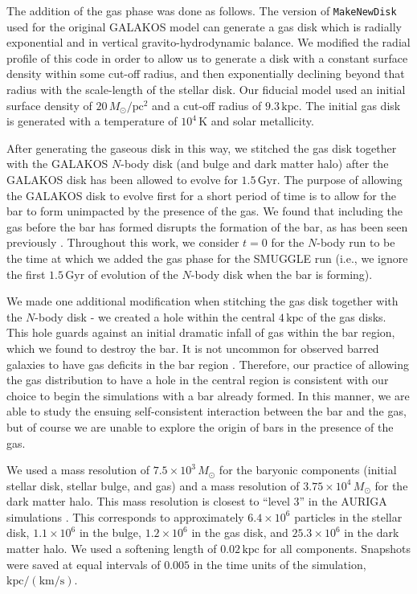 \documentclass[twocolumn,linenumbers]{aastex631}
\newcommand{\Nbody}{$N$-body}
\newcommand{\SMUGGLE}{SMUGGLE}
\begin{document}
The addition of the gas phase was done as follows. The version of
\texttt{MakeNewDisk} used for the original GALAKOS model can generate a gas disk
which is radially exponential and in vertical gravito-hydrodynamic balance. We
modified the radial profile of this code in order to allow us to generate a disk
with a constant surface density within some cut-off radius, and then
exponentially declining beyond that radius with the scale-length of the stellar
disk. Our fiducial model used an initial surface density of
$20\,M_{\odot}/\textrm{pc}^2$ and a cut-off radius of $9.3\,\textrm{kpc}$. The
initial gas disk is generated with a temperature of $10^4\,\textrm{K}$ and solar
metallicity.

After generating the gaseous disk in this way, we stitched the gas disk together
with the GALAKOS \Nbody{} disk (and bulge and dark matter halo) after the
GALAKOS disk has been allowed to evolve for $1.5\,\textrm{Gyr}$. The purpose of
allowing the GALAKOS disk to evolve first for a short period of time is to allow
for the bar to form unimpacted by the presence of the gas. We found that
including the gas before the bar has formed disrupts the formation of the bar,
as has been seen previously \citep[e.g.,][]{2013MNRAS.429.1949A}. Throughout
this work, we consider $t=0$ for the \Nbody{} run to be the time at which we
added the gas phase for the \SMUGGLE{} run (i.e., we ignore the first
$1.5\,\textrm{Gyr}$ of evolution of the \Nbody{} disk when the bar is forming).

We made one additional modification when stitching the gas disk together with
the \Nbody{} disk - we created a hole within the central $4\,\textrm{kpc}$ of
the gas disks. This hole guards against an initial dramatic infall of gas within
the bar region, which we found to destroy the bar. It is not uncommon for
observed barred galaxies to have gas deficits in the bar region \citep[though
not in the very center;][]{1993RPPh...56..173S}. Therefore, our practice of
allowing the gas distribution to have a hole in the central region is consistent
with our choice to begin the simulations with a bar already formed. In this
manner, we are able to study the ensuing self-consistent interaction between the
bar and the gas, but of course we are unable to explore the origin of bars in
the presence of the gas.

We used a mass resolution of $7.5\times10^3\,M_{\odot}$ for the baryonic
components (initial stellar disk, stellar bulge, and gas) and a mass resolution
of $3.75\times10^4\,M_{\odot}$ for the dark matter halo. This mass resolution is
closest to ``level 3'' in the AURIGA simulations \citep{2017MNRAS.467..179G}.
This corresponds to approximately $6.4\times10^6$ particles in the stellar disk,
$1.1\times10^6$ in the bulge, $1.2\times10^6$ in the gas disk, and
$25.3\times10^6$ in the dark matter halo. We used a softening length of
$0.02\,\textrm{kpc}$ for all components. Snapshots were saved at equal intervals
of $0.005$ in the time units of the simulation,
$\textrm{kpc}/(\textrm{km}/\textrm{s})$.
\end{document}
